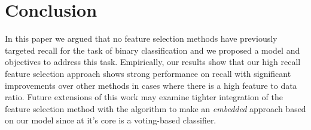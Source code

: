 \section{Conclusion}

In this paper we argued that no feature selection methods have
previously targeted recall for the task of binary classification and
we proposed a model and objectives to address this task.  Empirically,
our results show that our high recall feature selection approach shows
strong performance on recall with significant improvements over other
methods in cases where there is a high feature to data ratio.
Future extensions of this work may examine tighter integration of the
feature selection method with the algorithm to make an \emph{embedded}
approach based on our model since at it's core is a voting-based
classifier.

